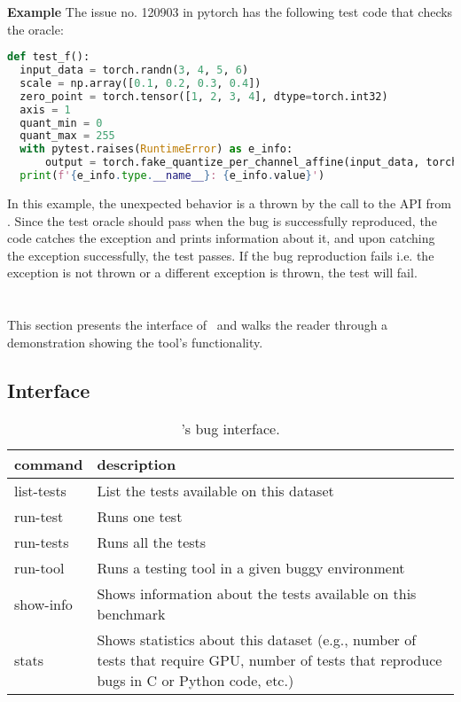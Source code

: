 \documentclass[sigconf,screen]{acmart}
\begin{document}
\textbf{Example}
  The issue no. 120903 in pytorch has the following test code that checks the oracle:

\begin{lstlisting}[language=python]
def test_f():
  input_data = torch.randn(3, 4, 5, 6)
  scale = np.array([0.1, 0.2, 0.3, 0.4])
  zero_point = torch.tensor([1, 2, 3, 4], dtype=torch.int32)
  axis = 1
  quant_min = 0
  quant_max = 255
  with pytest.raises(RuntimeError) as e_info:
      output = torch.fake_quantize_per_channel_affine(input_data, torch.from_numpy(scale), zero_point, axis, quant_min, quant_max)
  print(f'{e_info.type.__name__}: {e_info.value}')
\end{lstlisting}

In this example, the unexpected behavior is a  thrown by the call to the  API from \torch. Since the test oracle should pass when the bug is successfully reproduced, the code catches the exception and prints information about it, and upon catching the exception successfully, the test passes. If the bug reproduction fails i.e. the exception is not thrown or a different exception is thrown, the test will fail.

\section{\tname} %

This section presents the interface of \tname\ and walks the reader
through a demonstration showing the tool's functionality.


\subsection{Interface}

\begin{table}
  \centering
  \caption{\label{table:bug-interface}\tname's bug interface.}
\begin{tabular}{lp{6.5cm}}
  \toprule
  \textbf{command} & \textbf{description} \\
  \midrule
list-tests & List the tests available on this dataset\\
run-test & Runs one test\\
run-tests & Runs all the tests\\
run-tool & Runs a testing tool in a given buggy environment \\
show-info & Shows information about the tests available on this benchmark\\
stats & Shows statistics about this dataset (e.g., number of tests
that require GPU, number of tests that reproduce bugs in C or Python
code, etc.)\\
\bottomrule
\end{tabular}
\end{table}
\end{document}

